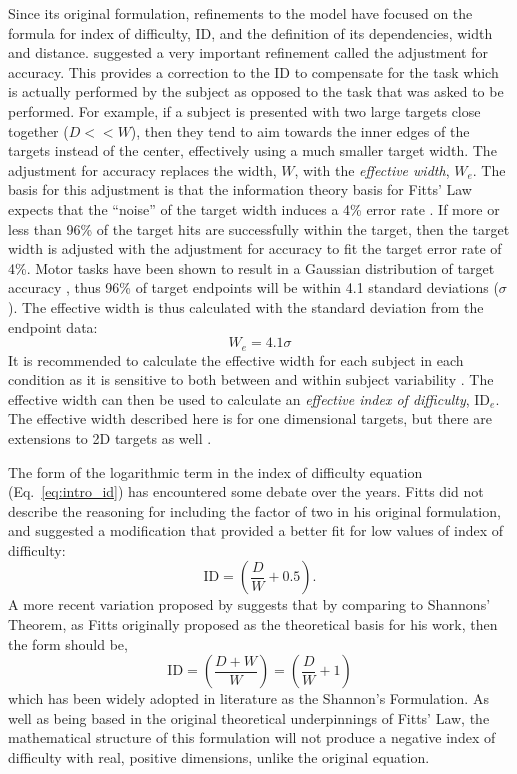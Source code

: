 Since its original formulation, refinements to the model have focused on the formula for index of difficulty, \(\text{ID}\), and the definition of its dependencies, width and distance.
\citet{crossman_speed_1957} suggested a very important refinement called the adjustment for accuracy.
This provides a correction to the \(\text{ID}\) to compensate for the task which is actually performed by the subject as opposed to the task that was asked to be performed.
For example, if a subject is presented with two large targets close together ($D << W$), then they tend to aim towards the inner edges of the targets instead of the center, effectively using a much smaller target width.
The adjustment for accuracy replaces the width, \(W\), with the \emph{effective width}, \(W_{e}\).
The basis for this adjustment is that the information theory basis for Fitts' Law expects that the ``noise'' of the target width induces a 4\% error rate \citep{mackenzie_fitts_1992}.
If more or less than 96\% of the target hits are successfully within the target, then the target width is adjusted with the adjustment for accuracy to fit the target error rate of 4\%.
Motor tasks have been shown to result in a Gaussian distribution of target accuracy \citep{crossman_feedback_1983,woodworth_accuracy_1899}, thus 96\% of target endpoints will be within 4.1 standard deviations (\(\sigma\)).
The effective width is thus calculated with the standard deviation from the endpoint data:
\begin{equation}
W_{e} = 4.1\sigma
\end{equation}
It is recommended to calculate the effective width for each subject in each condition as it is sensitive to both between and within subject variability \citep{soukoreff_towards_2004}.
The effective width can then be used to calculate an \emph{effective index of difficulty}, \(\text{ID}_{e}\).
The effective width described here is for one dimensional targets, but there are extensions to 2D targets as well \citep{murata_extending_2001}.

The form of the logarithmic term in the index of difficulty equation (Eq.\ \ref{eq:intro_id}) has encountered some debate over the years.
Fitts did not describe the reasoning for including the factor of two in his original formulation, and \citet{welford_fundamentals_1968} suggested a modification that provided a better fit for low values of index of difficulty:
\begin{equation}
    \mathrm{ID} = \left( \frac{D}{W} + 0.5 \right).
\end{equation}
A more recent variation proposed by \citet{mackenzie_note_1989} suggests that by comparing to Shannons' Theorem, as Fitts originally proposed as the theoretical basis for his work, then the form should be,
\begin{equation}
    \mathrm{ID} = \left( \frac{D + W}{W} \right) = \left( \frac{D}{W} + 1 \right)
\end{equation}
which has been widely adopted in literature as the Shannon's Formulation.
As well as being based in the original theoretical underpinnings of Fitts' Law, the mathematical structure of this formulation will not produce a negative index of difficulty with real, positive dimensions, unlike the original equation.

